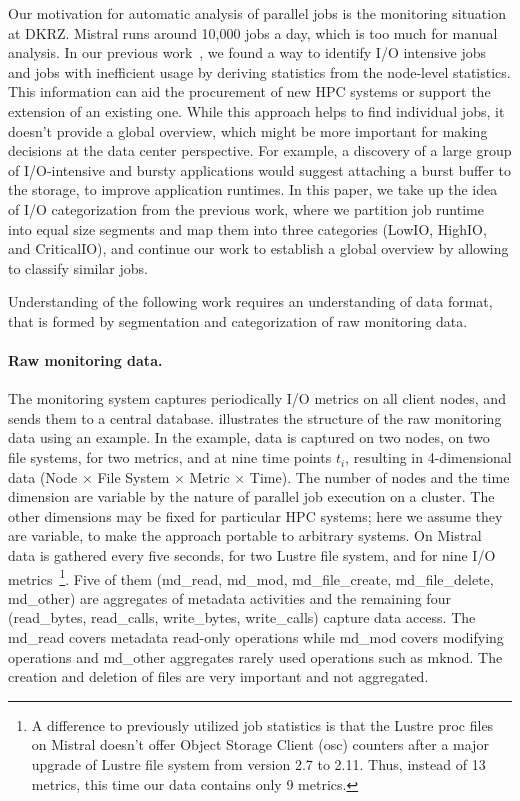 \documentclass{jhps}
\begin{document}
Our motivation for automatic analysis of parallel jobs is the monitoring situation at DKRZ.
Mistral runs around 10,000 jobs a day, which is too much for manual analysis.
In our previous work~\cite{iocats2020}, we found a way to identify I/O intensive jobs and jobs with inefficient usage by deriving statistics from the node-level statistics.
This information can aid the procurement of new HPC systems or support the extension of an existing one.
While this approach helps to find individual jobs, it doesn't provide a global overview, which might be more important for making decisions at the data center perspective.
For example, a discovery of a large group of I/O-intensive and bursty applications would suggest attaching a burst buffer to the storage, to improve application runtimes.
In this paper, we take up the idea of I/O categorization from the previous work, where we partition job runtime into equal size segments and map them into three categories (LowIO, HighIO, and CriticalIO), and continue our work to establish a global overview by allowing to classify similar jobs.

Understanding of the following work requires an understanding of data format, that is formed by segmentation and categorization of raw monitoring data.

\paragraph{Raw monitoring data.}
The monitoring system captures periodically I/O metrics on all client nodes, and sends them to a central database.
 illustrates the structure of the raw monitoring data using an example.
In the example, data is captured on two nodes, on two file systems, for two metrics, and at nine time points $t_i$, resulting in 4-dimensional data (Node $\times$ File System $\times$ Metric $\times$ Time).
The number of nodes and the time dimension are variable by the nature of parallel job execution on a cluster.
The other dimensions may be fixed for particular HPC systems; here we assume they are variable, to make the approach portable to arbitrary systems.
On Mistral data is gathered every five seconds, for two Lustre file system, and for nine I/O metrics~\footnote{A difference to previously utilized job statistics is that the Lustre proc files on Mistral doesn't offer Object Storage Client (osc) counters after a major upgrade of Lustre file system from version 2.7 to 2.11.
Thus, instead of 13 metrics, this time our data contains only 9 metrics.}.
Five of them (md\_read, md\_mod, md\_file\_create, md\_file\_delete, md\_other) are aggregates of metadata activities and the remaining four (read\_bytes, read\_calls, write\_bytes, write\_calls) capture data access.
The md\_read covers metadata read-only operations while md\_mod covers modifying operations and md\_other aggregates rarely used operations such as mknod.
The creation and deletion of files are very important and not aggregated.
\end{document}
